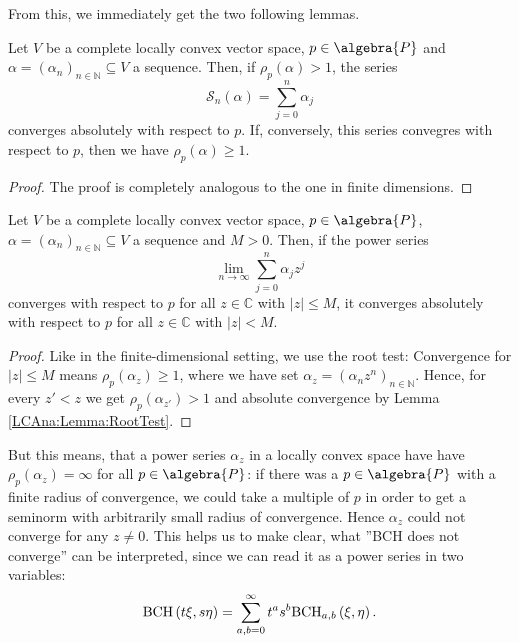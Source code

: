 From this, we immediately get the two following lemmas.
\begin{lemma}
	\label{LCAna:Lemma:RootTest}
	Let $V$ be a complete locally convex vector space, $p \in \algebra{P}$ 
	and $\alpha = (\alpha_n)_{n \in \mathbb{N}} \subseteq V$ a sequence. 
	Then, if $\rho_p(\alpha) > 1$, the series
	\begin{equation*}
		\mathcal{S}_n(\alpha)
		=
		\sum\limits_{j = 0}^n
		\alpha_j
	\end{equation*}
	converges absolutely with respect to $p$. If, conversely, this
	series convegres with respect to $p$, then we have 
	$\rho_p(\alpha) \geq 1$.	
\end{lemma}
\begin{proof}
	The proof is completely analogous to the one in finite dimensions.
\end{proof}
\begin{lemma}
	\label{LCAna:Lemma:PowerSeriesConvAbs}
	Let $V$ be a complete locally convex vector space, $p \in \algebra{P}$, 
	$\alpha = (\alpha_n)_{n \in \mathbb{N}} \subseteq V$ a sequence and
	$M > 0$. Then, if the power series
	\begin{equation*}
		\lim_{n \longrightarrow \infty}
		\sum\limits_{j = 0}^n
		\alpha_j z^j
	\end{equation*}
	converges with respect to $p$ for all $z \in \mathbb{C}$ with $|z| \leq M$, 
	it converges absolutely with respect to $p$ for all $z \in \mathbb{C}$ with 
	$|z| < M$.
\end{lemma}
\begin{proof}
	Like in the finite-dimensional setting, we use the root test: Convergence 
	for $|z| \leq M$ means $\rho_p(\alpha_z) \geq 1$, where we have set 
	$\alpha_z = (\alpha_n z^n)_{n \in \mathbb{N}}$. Hence, for every $z' < z$ 
	we get $\rho_p(\alpha_{z'}) > 1$ and absolute convergence by Lemma 
	\ref{LCAna:Lemma:RootTest}.
\end{proof}
But this means, that a power series $\alpha_z$ in a locally convex space have 
have $\rho_p(\alpha_z) = \infty$ for all $p \in \algebra{P}$: if there was a $p 
\in \algebra{P}$ with a finite radius of convergence, we could take a multiple 
of $p$ in order to get a seminorm with arbitrarily small radius of convergence. 
Hence $\alpha_z$ could not converge for any $z \neq 0$. This helps us to make 
clear, what ''BCH does not converge'' can be interpreted, since we can read it 
as a power series in two variables:
\begin{equation*}
	\mathrm{BCH}\left(t \xi, s \eta\right)
	=
	\sum\limits_{a,b = 0}^{\infty}
	t^a s^b
	\mathrm{BCH}_{a, b}\left(\xi, \eta\right).
\end{equation*}
